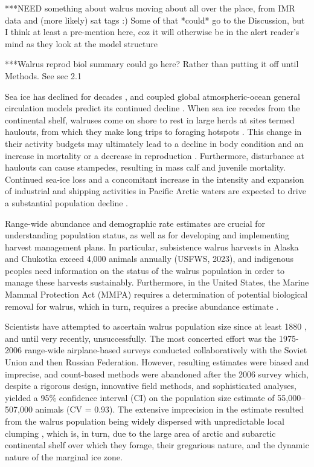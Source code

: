 {*}{*}{*}NEED something about walrus moving about all over the place,
from IMR data and (more likely) sat tags :) Some of that {*}could{*}
go to the Discussion, but I think at least a pre-mention here, coz
it will otherwise be in the alert reader's mind as they look at the
model structure

{*}{*}{*}Walrus reprod biol summary could go here? Rather than putting
it off until Methods. See sec 2.1

Sea ice has declined for decades \citep{perovich_loss_2009,stroeve_trends_2012,stroeve_changing_2018},
and coupled global atmospheric-ocean general circulation models predict
its continued decline \citep{arthun_seasonal_2021}. When sea ice
recedes from the continental shelf, walruses come on shore to rest
in large herds at sites termed haulouts, from which they make long
trips to foraging hotspots \citep{jay_walrus_2012}. This change in
their activity budgets \citep{jay_walrus_2017} may ultimately lead
to a decline in body condition and an increase in mortality or a decrease
in reproduction \citep{udevitz_forecasting_2017}. Furthermore, disturbance
at haulouts can cause stampedes, resulting in mass calf and juvenile
mortality. Continued sea-ice loss and a concomitant increase in the
intensity and expansion of industrial and shipping activities in Pacific
Arctic waters \citep{silber_vessel_2019} are expected to drive a
substantial population decline \citep{garlich-miller_status_2011,maccracken_final_2017,johnson_assessing_2023,johnson_assessing_2024}.

Range-wide abundance and demographic rate estimates are crucial for
understanding population status, as well as for developing and implementing
harvest management plans. In particular, subsistence walrus harvests
in Alaska and Chukotka exceed 4,000 animals annually (USFWS, 2023),
and indigenous peoples need information on the status of the walrus
population in order to manage these harvests sustainably. Furthermore,
in the United States, the Marine Mammal Protection Act (MMPA) requires
a determination of potential biological removal for walrus, which
in turn, requires a precise abundance estimate \citep{gilbert_review_1999,wade_determining_1999}.

Scientists have attempted to ascertain walrus population size since
at least 1880 \citep{fay_managing_1989}, and until very recently,
unsuccessfully. The most concerted effort was the 1975-2006 range-wide
airplane-based surveys conducted collaboratively with the Soviet Union
and then Russian Federation. However, resulting estimates were biased
and imprecise, and count-based methods were abandoned after the 2006
survey which, despite a rigorous design, innovative field methods,
and sophisticated analyses, yielded a 95\% confidence interval (CI)
on the population size estimate of 55,000–507,000 animals (CV = 0.93).
The extensive imprecision in the estimate resulted from the walrus
population being widely dispersed with unpredictable local clumping
\citep{speckman_results_2011,jay_walrus_2012}, which is, in turn,
due to the large area of arctic and subarctic continental shelf over
which they forage, their gregarious nature, and the dynamic nature
of the marginal ice zone.

